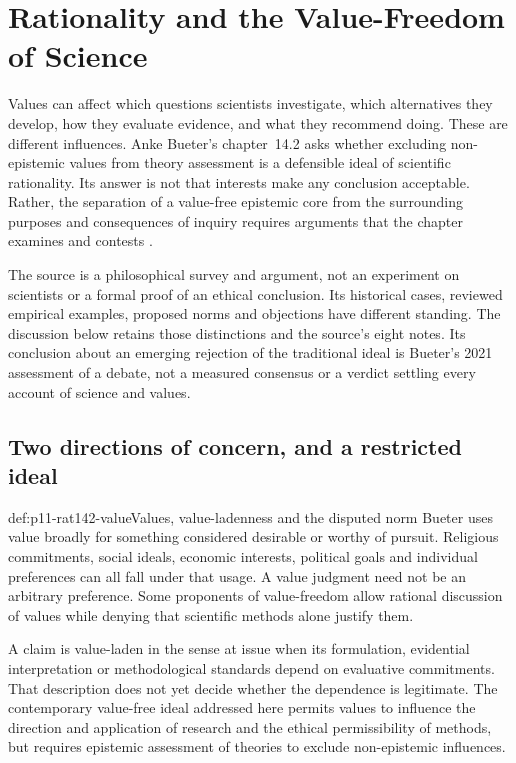\chapter{Rationality and the Value-Freedom of Science}
\label{sec:p11-rationality-14-2}

Values can affect which questions scientists investigate, which alternatives
they develop, how they evaluate evidence, and what they recommend doing.
These are different influences. Anke Bueter's chapter~14.2 asks whether
excluding non-epistemic values from theory assessment is a defensible ideal
of scientific rationality. Its answer is not that interests make any
conclusion acceptable. Rather, the separation of a value-free epistemic
core from the surrounding purposes and consequences of inquiry requires
arguments that the chapter examines and contests
\cite[pp.~757--765]{Bueter2021ValueFreedom}.

The source is a philosophical survey and argument, not an experiment on
scientists or a formal proof of an ethical conclusion. Its historical cases,
reviewed empirical examples, proposed norms and objections have different
standing. The discussion below retains those distinctions and the source's
eight notes. Its conclusion about an emerging rejection of the traditional
ideal is Bueter's 2021 assessment of a debate, not a measured consensus or
a verdict settling every account of science and values.

\section{Two directions of concern, and a restricted ideal}
\label{sec:p11-rat142-ideal}

\begin{hbdefinition}{def:p11-rat142-value}{Values, value-ladenness and the disputed norm}
Bueter uses value broadly for something considered desirable or worthy of
pursuit. Religious commitments, social ideals, economic interests,
political goals and individual preferences can all fall under that usage.
A value judgment need not be an arbitrary preference. Some proponents of
value-freedom allow rational discussion of values while denying that
scientific methods alone justify them.

A claim is value-laden in the sense at issue when its formulation,
evidential interpretation or methodological standards depend on evaluative
commitments. That description does not yet decide whether the dependence
is legitimate. The contemporary value-free ideal addressed here permits
values to influence the direction and application of research and the
ethical permissibility of methods, but requires epistemic assessment of
theories to exclude non-epistemic influences.
\end{hbdefinition}

